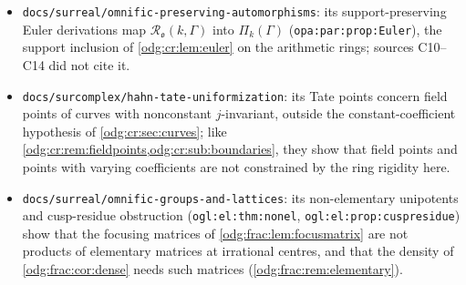 \documentclass[11pt,oneside]{article}
\numberwithin{equation}{section}
\theoremstyle{definition}
\theoremstyle{remark}
\newcommand{\No}{\mathbf{No}}
\newcommand{\Oz}{\mathbf{Oz}}
\newcommand{\Q}{\mathbb Q}
\newcommand{\replabel}[1]{\nolinkurl{#1}}
\newcommand{\fn}[1]{\nolinkurl{#1}}
\newcommand{\crA}{\mathcal A_\Bbbk(\Gamma)}
\newcommand{\crP}{\Pi_\Bbbk(\Gamma)}
\begin{document}
\begin{itemize}[leftmargin=*]
(\replabel{osq:tn:thm:duals}), the intersection formula of
\cref{odg:frac:ex:nolcm} for monomial $t$ (\replabel{osq:tn:thm:syzygy}), and
the scalar step of \cref{odg:frac:thm:pullback} (\replabel{osq:tn:thm:hom}).
Localization at the positive monomials gives $\No$
(\replabel{osq:prop:fractions}), and the residue field $\Q$ of $\Oz_\Pi$ agrees
with its list of small primes (\replabel{osq:cor:smallprimes}). Its class-valued
derivations $\Oz\to\Pi$ (\replabel{osq:prop:classder}) contain the support inclusion
$\partial(\crA)\subseteq\crP$ used in \cref{odg:cr:sec:principle}; its theorem that
derivations of the class ring into set-sized modules vanish
(\replabel{osq:thm:derivations}) is no conflict, since the Euler derivations here act
on set-sized workspaces and take values in them. A derivation on a
workspace is not a derivation from the full class $\Oz$ into a set-sized
$\Oz$-module; the latter module structure is an additional hypothesis. Its manuscript 18's canonical translation
and rich-target theorems (\replabel{osq:or:thm:canonical}, \replabel{osq:or:thm:targets})
give the same translation normal forms as
\cref{odg:disc:thm:translation,odg:disc:thm:critical}, for integer-valued
polynomials with more inputs of ordinary output, or of output in one
ordinary coset, than their degree. These are different hypotheses from a
constant discriminant (\cref{odg:disc:rem:osq}); discreteness alone does not
force a polynomial into translation form.
\item \fn{docs/surreal/omnific-preserving-automorphisms}: its support-preserving
Euler derivations map $\mathcal R_{\mathfrak o}(k,\Gamma)$ into $\Pi_k(\Gamma)$
(\replabel{opa:par:prop:Euler}), the support inclusion of \cref{odg:cr:lem:euler} on
the arithmetic rings; sources C10--C14 did not cite it.
\item \fn{docs/surcomplex/hahn-tate-uniformization}: its Tate points concern field
points of curves with nonconstant $j$-invariant, outside the constant-coefficient
hypothesis of \cref{odg:cr:sec:curves}; like
\cref{odg:cr:rem:fieldpoints,odg:cr:sub:boundaries}, they show that field points and
points with varying coefficients are not constrained by the ring rigidity here.
\item \fn{docs/surreal/omnific-groups-and-lattices}: its non-elementary
unipotents and cusp-residue obstruction
(\replabel{ogl:el:thm:nonel}, \replabel{ogl:el:prop:cuspresidue}) show that the
focusing matrices of \cref{odg:frac:lem:focusmatrix} are not products of
elementary matrices at irrational centres, and that the density of
\cref{odg:frac:cor:dense} needs such matrices (\cref{odg:frac:rem:elementary}).

\end{itemize}
\end{document}
